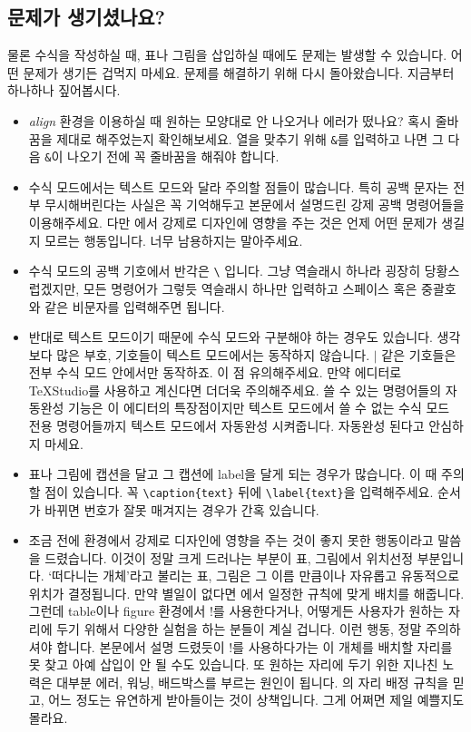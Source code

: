 \subsection{문제가 생기셨나요?}
\label{subsec:problem4}
물론 수식을 작성하실 때, 표나 그림을 삽입하실 때에도 문제는 발생할 수 있습니다.
어떤 문제가 생기든 겁먹지 마세요.
문제를 해결하기 위해 다시 돌아왔습니다.
지금부터 하나하나 짚어봅시다.
\begin{itemize}
	\item \emph{align} 환경을 이용하실 때 원하는 모양대로 안 나오거나 에러가 떴나요?
	혹시 줄바꿈을 제대로 해주었는지 확인해보세요.
	열을 맞추기 위해 \verb|&|를 입력하고 나면 그 다음 \verb|&|이 나오기 전에 꼭 줄바꿈을 해줘야 합니다.

	\item 수식 모드에서는 텍스트 모드와 달라 주의할 점들이 많습니다.
	특히 공백 문자는 전부 무시해버린다는 사실은 꼭 기억해두고 본문에서 설명드린 강제 공백 명령어들을 이용해주세요.
	다만 \lt 에서 강제로 디자인에 영향을 주는 것은 언제 어떤 문제가 생길지 모르는 행동입니다.
	너무 남용하지는 말아주세요.
	
	\item 수식 모드의 공백 기호에서 반각은 \verb|\| 입니다.
	그냥 역슬래시 하나라 굉장히 당황스럽겠지만, 모든 명령어가 그렇듯 역슬래시 하나만 입력하고 스페이스 혹은 중괄호와 같은 비문자를 입력해주면 됩니다.
	
	\item 반대로 텍스트 모드이기 때문에 수식 모드와 구분해야 하는 경우도 있습니다.
	생각보다 많은 부호, 기호들이 텍스트 모드에서는 동작하지 않습니다.
	$\mid$ 같은 기호들은 전부 수식 모드 안에서만 동작하죠.
	이 점 유의해주세요.
	만약 에디터로 \TeX Studio를 사용하고 계신다면 더더욱 주의해주세요.
	쓸 수 있는 명령어들의 자동완성 기능은 이 에디터의 특장점이지만 텍스트 모드에서 쓸 수 없는 수식 모드 전용 명령어들까지 텍스트 모드에서 자동완성 시켜줍니다.
	자동완성 된다고 안심하지 마세요.
	
	\item 표나 그림에 캡션을 달고 그 캡션에 label을 달게 되는 경우가 많습니다.
	이 때 주의할 점이 있습니다.
	꼭 \verb|\caption{text}| 뒤에 \verb|\label{text}|을 입력해주세요.
	순서가 바뀌면 번호가 잘못 매겨지는 경우가 간혹 있습니다.
	
	\item 조금 전에 \lt 환경에서 강제로 디자인에 영향을 주는 것이 좋지 못한 행동이라고 말씀을 드렸습니다.
	이것이 정말 크게 드러나는 부분이 표, 그림에서 위치선정 부분입니다.
	`떠다니는 개체'라고 불리는 표, 그림은 그 이름 만큼이나 자유롭고 유동적으로 위치가 결정됩니다.
	만약 별일이 없다면 \lt 에서 일정한 규칙에 맞게 배치를 해줍니다.
	그런데 table이나 figure 환경에서 !를 사용한다거나, 어떻게든 사용자가 원하는 자리에 두기 위해서 다양한 실험을 하는 분들이 계실 겁니다.
	이런 행동, 정말 주의하셔야 합니다.
	본문에서 설명 드렸듯이 !를 사용하다가는 \lt 이 개체를 배치할 자리를 못 찾고 아예 삽입이 안 될 수도 있습니다.
	또 원하는 자리에 두기 위한 지나친 노력은 대부분 에러, 워닝, 배드박스를 부르는 원인이 됩니다.
	\lt 의 자리 배정 규칙을 믿고, 어느 정도는 유연하게 받아들이는 것이 상책입니다.
	그게 어쩌면 제일 예쁠지도 몰라요.
	

\end{itemize}
